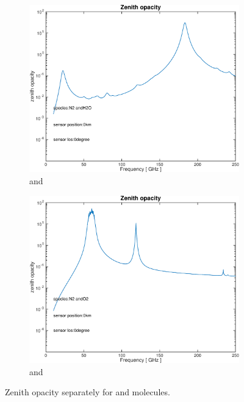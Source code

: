\documentclass[paper=a4, fontsize=11pt]{scrartcl} %
\begin{document}
\begin{figure}[ht]
  \centering
  \begin{subfigure}[t]{0.45\textwidth}
  \includegraphics[width=\textwidth]{plots/opacity_N2+H2O_0km_0deg.pdf}
  \caption{ and }
  \end{subfigure}
  \begin{subfigure}[t]{0.45\textwidth}
  \includegraphics[width=\textwidth]{plots/opacity_N2+O2_0km_0deg.pdf}
  \caption{ and }
  \end{subfigure}
  \caption{Zenith opacity separately for  and  molecules.}
  \label{figure:abs_molucules}
\end{figure}
\end{document}
